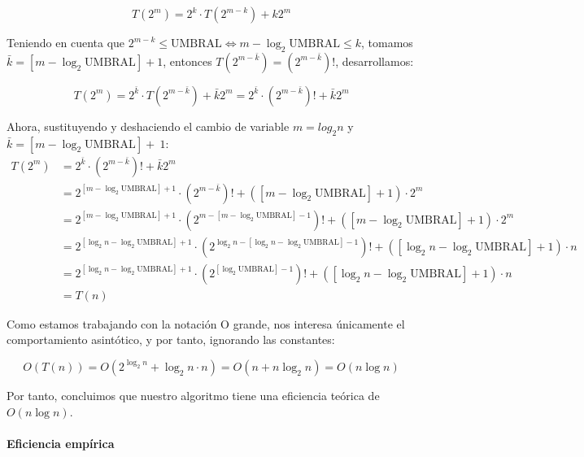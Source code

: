 \documentclass{article}
\newcommand{\myparagraph}[1]{\paragraph{#1}\mbox{}\\}
\begin{document}
    \[
        T\left(2^{m}\right) = 2^{k} \cdot T\left(2^{m-k}\right) + k 2^{m}
    \]

    Teniendo en cuenta que $2^{m-k} \leq \text{UMBRAL} \iff m - \log_{2}{\text{UMBRAL}} \leq k $, tomamos $\bar{k} = [m - \log_{2}{\text{UMBRAL}}] + 1$, entonces $T\left(2^{m-\bar{k}}\right) =  (2^{m-\bar{k}})!$, desarrollamos: 
    
    \[
        T\left(2^{m}\right) = 2^{\bar{k}} \cdot T\left(2^{m-\bar{k}}\right) + \bar{k} 2^{m} 
                 = 2^{\bar{k}} \cdot (2^{m-\bar{k}})! + \bar{k} 2^{m} 
    \]

    Ahora, sustituyendo y deshaciendo el cambio de variable $m = log_{2}{n}$ y $\bar{k} = [m - \log_{2}{\text{UMBRAL}}] +~1$:
\begin{align*}
    T\left(2^{m}\right) &= 2^{\bar{k}} \cdot (2^{m-\bar{k}})! + \bar{k} 2^{m} \\
    &= 2^{ [m - \log_{2}{\text{UMBRAL}}] + 1} \cdot (2^{m-\bar{k}})! + ([m - \log_{2}{\text{UMBRAL}}] + 1) \cdot 2^{m} \\
    &= 2^{ [m - \log_{2}{\text{UMBRAL}}] + 1} \cdot (2^{m- [m - \log_{2}{\text{UMBRAL}}] - 1})! + ([m - \log_{2}{\text{UMBRAL}}] + 1) \cdot 2^{m} \\
    &= 2^{ [\log_{2}{n} - \log_{2}{\text{UMBRAL}}] + 1} \cdot (2^{\log_{2}{n} - [\log_{2}{n} - \log_{2}{\text{UMBRAL}}] - 1})! + ([\log_{2}{n} - \log_{2}{\text{UMBRAL}}] + 1) \cdot n  \\
    &= 2^{ [\log_{2}{n} - \log_{2}{\text{UMBRAL}}] + 1} \cdot (2^{[\log_{2}{\text{UMBRAL}}] - 1})! + ([\log_{2}{n} - \log_{2}{\text{UMBRAL}}] + 1) \cdot n \\
    &=T(n)
\end{align*}

    Como estamos trabajando con la notación O grande, nos interesa únicamente el comportamiento asintótico, y por tanto, ignorando las constantes:

    \[
         O(T(n)) = O(2^{\log_{2}{n}} + \log_{2}{n} \cdot n) = O\left(n + n\log_{2}{n}\right) = O\left(n\log{n}\right) 
    \]

    Por tanto, concluimos que nuestro algoritmo tiene una eficiencia teórica de $O(n\log{n})$.

\newpage
\myparagraph{Eficiencia empírica}
\end{document}

